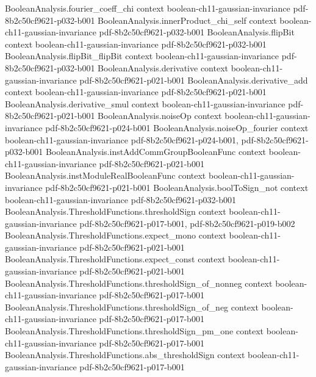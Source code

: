 \begin{theorem}
  {BooleanAnalysis.fourier_coeff_chi}
  {context}
  {boolean-ch11-gaussian-invariance}
  {pdf-8b2c50cf9621-p032-b001}
\proofstep
  {BooleanAnalysis.innerProduct_chi_self}
  {context}
  {boolean-ch11-gaussian-invariance}
  {pdf-8b2c50cf9621-p032-b001}
\proofstep
  {BooleanAnalysis.flipBit}
  {context}
  {boolean-ch11-gaussian-invariance}
  {pdf-8b2c50cf9621-p032-b001}
\proofstep
  {BooleanAnalysis.flipBit_flipBit}
  {context}
  {boolean-ch11-gaussian-invariance}
  {pdf-8b2c50cf9621-p032-b001}
\proofstep
  {BooleanAnalysis.derivative}
  {context}
  {boolean-ch11-gaussian-invariance}
  {pdf-8b2c50cf9621-p021-b001}
\proofstep
  {BooleanAnalysis.derivative_add}
  {context}
  {boolean-ch11-gaussian-invariance}
  {pdf-8b2c50cf9621-p021-b001}
\proofstep
  {BooleanAnalysis.derivative_smul}
  {context}
  {boolean-ch11-gaussian-invariance}
  {pdf-8b2c50cf9621-p021-b001}
\proofstep
  {BooleanAnalysis.noiseOp}
  {context}
  {boolean-ch11-gaussian-invariance}
  {pdf-8b2c50cf9621-p024-b001}
\proofstep
  {BooleanAnalysis.noiseOp_fourier}
  {context}
  {boolean-ch11-gaussian-invariance}
  {pdf-8b2c50cf9621-p024-b001,
    pdf-8b2c50cf9621-p032-b001}
\proofstep
  {BooleanAnalysis.instAddCommGroupBooleanFunc}
  {context}
  {boolean-ch11-gaussian-invariance}
  {pdf-8b2c50cf9621-p021-b001}
\proofstep
  {BooleanAnalysis.instModuleRealBooleanFunc}
  {context}
  {boolean-ch11-gaussian-invariance}
  {pdf-8b2c50cf9621-p021-b001}
\proofstep
  {BooleanAnalysis.boolToSign_not}
  {context}
  {boolean-ch11-gaussian-invariance}
  {pdf-8b2c50cf9621-p032-b001}
\proofstep
  {BooleanAnalysis.ThresholdFunctions.thresholdSign}
  {context}
  {boolean-ch11-gaussian-invariance}
  {pdf-8b2c50cf9621-p017-b001,
    pdf-8b2c50cf9621-p019-b002}
\proofstep
  {BooleanAnalysis.ThresholdFunctions.expect_mono}
  {context}
  {boolean-ch11-gaussian-invariance}
  {pdf-8b2c50cf9621-p021-b001}
\proofstep
  {BooleanAnalysis.ThresholdFunctions.expect_const}
  {context}
  {boolean-ch11-gaussian-invariance}
  {pdf-8b2c50cf9621-p021-b001}
\proofstep
  {BooleanAnalysis.ThresholdFunctions.thresholdSign_of_nonneg}
  {context}
  {boolean-ch11-gaussian-invariance}
  {pdf-8b2c50cf9621-p017-b001}
\proofstep
  {BooleanAnalysis.ThresholdFunctions.thresholdSign_of_neg}
  {context}
  {boolean-ch11-gaussian-invariance}
  {pdf-8b2c50cf9621-p017-b001}
\proofstep
  {BooleanAnalysis.ThresholdFunctions.thresholdSign_pm_one}
  {context}
  {boolean-ch11-gaussian-invariance}
  {pdf-8b2c50cf9621-p017-b001}
\proofstep
  {BooleanAnalysis.ThresholdFunctions.abs_thresholdSign}
  {context}
  {boolean-ch11-gaussian-invariance}
  {pdf-8b2c50cf9621-p017-b001}

\end{theorem}
